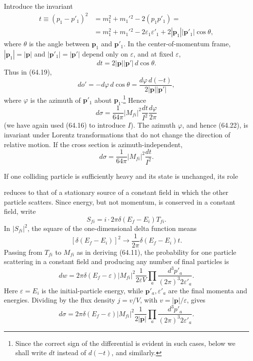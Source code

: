 Introduce the invariant
\begin{equation}
\begin{aligned}
t\equiv(p_1-p'_1)^2&=m_1^2+m_1'{}^2-2(p_1p'_1)={}\\
&=m_1^2+m_1'{}^2-2\varepsilon_1\varepsilon'_1+2|\mathbf p_1||\mathbf p'_1|\cos\theta,
\end{aligned}
\tag{64.20}
\end{equation}
where $\theta$ is the angle between $\mathbf p_1$ and $\mathbf p'_1$. In the center-of-momentum frame, $|\mathbf p_1|=|\mathbf p|$ and $|\mathbf p'_1|=|\mathbf p'|$ depend only on $\varepsilon$, and at fixed $\varepsilon$,
\begin{equation}
dt=2|\mathbf p||\mathbf p'|\,d\cos\theta.
\tag{64.21}
\end{equation}
Thus in (64.19),
\[
do'=-d\varphi\,d\cos\theta=\frac{d\varphi\,d(-t)}{2|\mathbf p||\mathbf p'|},
\]
where $\varphi$ is the azimuth of $\mathbf p'_1$ about $\mathbf p_1$.\footnote{Since the correct sign of the differential is evident in such cases, below we shall write $dt$ instead of $d(-t)$, and similarly.} Hence
\begin{equation}
d\sigma=\frac1{64\pi}|M_{fi}|^2\frac{dt}{I^2}\frac{d\varphi}{2\pi}
\tag{64.22}
\end{equation}
(we have again used (64.16) to introduce $I$). The azimuth $\varphi$, and hence (64.22), is invariant under Lorentz transformations that do not change the direction of relative motion. If the cross section is azimuth-independent,
\begin{equation}
d\sigma=\frac1{64\pi}|M_{fi}|^2\frac{dt}{I^2}.
\tag{64.23}
\end{equation}

If one colliding particle is sufficiently heavy and its state is unchanged, its role

reduces to that of a stationary source of a constant field in which the other particle scatters. Since energy, but not momentum, is conserved in a constant field, write
\begin{equation}
S_{fi}=i\cdot2\pi\delta(E_f-E_i)T_{fi}.
\tag{64.24}
\end{equation}
In $|S_{fi}|^2$, the square of the one-dimensional delta function means
\[
[\delta(E_f-E_i)]^2\to\frac1{2\pi}\delta(E_f-E_i)t.
\]
Passing from $T_{fi}$ to $M_{fi}$ as in deriving (64.11), the probability for one particle scattering in a constant field and producing any number of final particles is
\[
dw=2\pi\delta(E_f-\varepsilon)|M_{fi}|^2\frac1{2\varepsilon V}
\prod_a\frac{d^3p'_a}{(2\pi)^3 2\varepsilon'_a}.
\]
Here $\varepsilon=E_i$ is the initial-particle energy, while $\mathbf p'_a,\varepsilon'_a$ are the final momenta and energies. Dividing by the flux density $j=v/V$, with $v=|\mathbf p|/\varepsilon$, gives
\begin{equation}
d\sigma=2\pi\delta(E_f-\varepsilon)|M_{fi}|^2\frac1{2|\mathbf p|}
\prod_a\frac{d^3p'_a}{(2\pi)^3 2\varepsilon'_a}.
\tag{64.25}
\end{equation}

